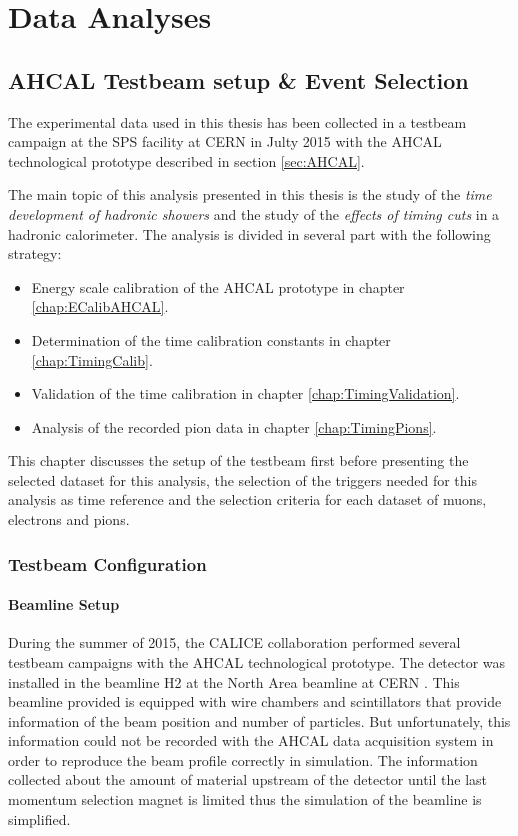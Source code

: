 \part{Data Analyses}
\label{chap:TimingAHCAL}

\chapter{AHCAL Testbeam setup \& Event Selection}
\label{chap:EvtSelection}

The experimental data used in this thesis has been collected in a testbeam campaign at the SPS facility at CERN in Julty 2015 with the AHCAL technological prototype described in section \ref{sec:AHCAL}.

The main topic of this analysis presented in this thesis is the study of the \textit{time development of hadronic showers} and the study of the \textit{effects of timing cuts} in a hadronic calorimeter. The analysis is divided in several part with the following strategy:
\begin{itemize}
	\item Energy scale calibration of the AHCAL prototype in chapter \ref{chap:ECalibAHCAL}.
	\item Determination of the time calibration constants in chapter \ref{chap:TimingCalib}.
	\item Validation of the time calibration in chapter \ref{chap:TimingValidation}.
	\item Analysis of the recorded pion data in chapter \ref{chap:TimingPions}.
\end{itemize}

This chapter discusses the setup of the testbeam first before presenting the selected dataset for this analysis, the selection of the triggers needed for this analysis as time reference and the selection criteria for each dataset of muons, electrons and pions.

\section{Testbeam Configuration}

\subsection{Beamline Setup}
\label{sec:beamline}

During the summer of 2015, the CALICE collaboration performed several testbeam campaigns with the AHCAL technological prototype. The detector was installed in the beamline H2 at the North Area beamline at CERN \cite{H2Beamline}. This beamline provided is equipped with wire chambers and scintillators that provide information of the beam position and number of particles. But unfortunately, this information could not be recorded with the AHCAL data acquisition system in order to reproduce the beam profile correctly in simulation. The information collected about the amount of material upstream of the detector until the last momentum selection magnet is limited thus the simulation of the beamline is simplified.

